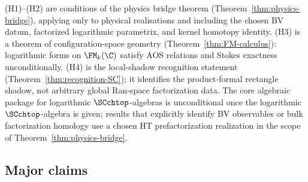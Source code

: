 (H1)--(H2) are conditions of the physics bridge theorem (Theorem~\ref{thm:physics-bridge}), applying only to physical realisations and including the chosen BV datum, factorized logarithmic parametrix, and kernel homotopy identity. (H3) is a theorem of configuration-space geometry (Theorem~\ref{thm:FM-calculus}): logarithmic forms on $\FM_k(\C)$ satisfy AOS relations and Stokes exactness unconditionally. (H4) is the local-shadow recognition statement (Theorem~\ref{thm:recognition-SC}); it identifies the product-formal rectangle shadow, not arbitrary global Ran-space factorization data. The core algebraic package for logarithmic $\SCchtop$-algebras is unconditional once the logarithmic $\SCchtop$-algebra is given; results that explicitly identify BV observables or bulk factorization homology use a chosen HT prefactorization realization in the scope of Theorem~\ref{thm:physics-bridge}.

\subsection{Major claims}

